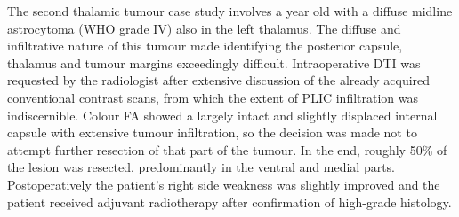 The second thalamic tumour case study involves a  year old with a diffuse midline astrocytoma (WHO grade IV) also in the left thalamus.
The diffuse and infiltrative nature of this tumour made identifying the posterior capsule, thalamus and tumour margins exceedingly difficult.
Intraoperative DTI was requested by the radiologist after extensive discussion of the already acquired conventional contrast scans, from which the extent of PLIC infiltration was indiscernible.
Colour FA showed a largely intact and slightly displaced internal capsule with extensive tumour infiltration, so the decision was made not to attempt further resection of that part of the tumour.
In the end, roughly 50\% of the lesion was resected, predominantly in the ventral and medial parts.
Postoperatively the patient's right side weakness was slightly improved and the patient received adjuvant radiotherapy  after confirmation of high-grade histology.
